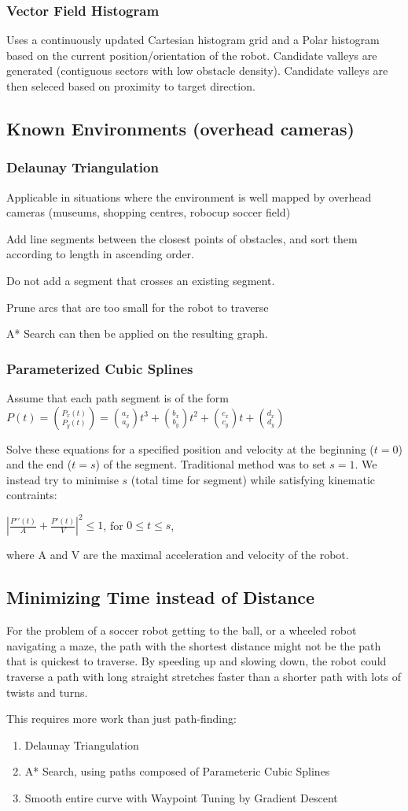 \subsubsection{Vector Field Histogram}
Uses a continuously updated Cartesian histogram grid and a Polar histogram
based on the current position/orientation of the robot. Candidate valleys are
generated (contiguous sectors with low obstacle density). Candidate valleys are
then seleced based on proximity to target direction.

\subsection{Known Environments (overhead cameras)}
\subsubsection{Delaunay Triangulation}
Applicable in situations where the environment is well mapped by overhead
cameras (museums, shopping centres, robocup soccer field)

Add line segments between the closest points of obstacles, and sort them
according to length in ascending order.

Do not add a segment that crosses an existing segment.

Prune arcs that are too small for the robot to traverse

A* Search can then be applied on the resulting graph.

\subsubsection{Parameterized Cubic Splines}
Assume that each path segment is of the form\\
$P(t) = \binom{P_{x}(t)}{P_{y}(t)} = \binom{a_x}{a_y}t^3 + \binom{b_x}{b_y}t^2
+ \binom{c_x}{c_y}t + \binom{d_x}{d_y}$

Solve these equations for a specified position and velocity at the beginning
($t = 0$) and the end ($t = s$) of the segment. Traditional method was to set
$s = 1$. We instead try to minimise $s$ (total time for segment) while
satisfying kinematic contraints:

{\centering $|\frac{P\prime\prime(t)}{A} + \frac{P\prime(t)}{V}|^2 \leq 1$, for $0 \leq t
\leq s$,

}

where A and V are the maximal acceleration and velocity of the robot.

\subsection{Minimizing Time instead of Distance}
For the problem of a soccer robot getting to the ball, or a wheeled robot
navigating a maze, the path with the shortest distance might not be the path
that is quickest to traverse. By speeding up and slowing down, the robot could
traverse a path with long straight stretches faster than a shorter path with
lots of twists and turns.

This requires more work than just path-finding:
\begin{enumerate}
    \item Delaunay Triangulation
    \item A* Search, using paths composed of Parameteric Cubic Splines
    \item Smooth entire curve with Waypoint Tuning by Gradient Descent
\end{enumerate}
